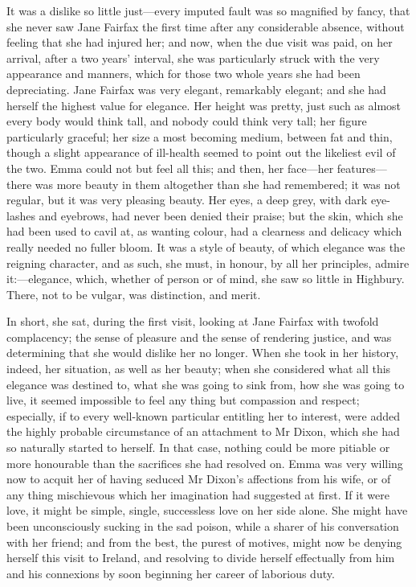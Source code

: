 It was a dislike so little just—every imputed fault was so magnified by fancy, that she never saw Jane Fairfax the first time after any considerable absence, without feeling that she had injured her; and now, when the due visit was paid, on her arrival, after a two years' interval, she was particularly struck with the very appearance and manners, which for those two whole years she had been depreciating. Jane Fairfax was very elegant, remarkably elegant; and she had herself the highest value for elegance. Her height was pretty, just such as almost every body would think tall, and nobody could think very tall; her figure particularly graceful; her size a most becoming medium, between fat and thin, though a slight appearance of ill-health seemed to point out the likeliest evil of the two. Emma could not but feel all this; and then, her face—her features—there was more beauty in them altogether than she had remembered; it was not regular, but it was very pleasing beauty. Her eyes, a deep grey, with dark eye-lashes and eyebrows, had never been denied their praise; but the skin, which she had been used to cavil at, as wanting colour, had a clearness and delicacy which really needed no fuller bloom. It was a style of beauty, of which elegance was the reigning character, and as such, she must, in honour, by all her principles, admire it:—elegance, which, whether of person or of mind, she saw so little in Highbury. There, not to be vulgar, was distinction, and merit.

In short, she sat, during the first visit, looking at Jane Fairfax with twofold complacency; the sense of pleasure and the sense of rendering justice, and was determining that she would dislike her no longer. When she took in her history, indeed, her situation, as well as her beauty; when she considered what all this elegance was destined to, what she was going to sink from, how she was going to live, it seemed impossible to feel any thing but compassion and respect; especially, if to every well-known particular entitling her to interest, were added the highly probable circumstance of an attachment to Mr Dixon, which she had so naturally started to herself. In that case, nothing could be more pitiable or more honourable than the sacrifices she had resolved on. Emma was very willing now to acquit her of having seduced Mr Dixon's affections from his wife, or of any thing mischievous which her imagination had suggested at first. If it were love, it might be simple, single, successless love on her side alone. She might have been unconsciously sucking in the sad poison, while a sharer of his conversation with her friend; and from the best, the purest of motives, might now be denying herself this visit to Ireland, and resolving to divide herself effectually from him and his connexions by soon beginning her career of laborious duty.

